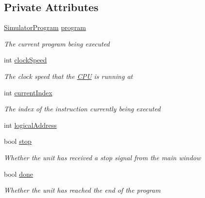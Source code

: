 \subsection*{Private Attributes}
\begin{DoxyCompactItemize}
\item 
\hyperlink{class_c_p_u___o_s___simulator_1_1_c_p_u_1_1_simulator_program}{Simulator\+Program} \hyperlink{class_c_p_u___o_s___simulator_1_1_c_p_u_1_1_execution_unit_a192670bee8ca089c38e9989350f658d6}{program}
\begin{DoxyCompactList}\small\item\em The current program being executed \end{DoxyCompactList}\item 
int \hyperlink{class_c_p_u___o_s___simulator_1_1_c_p_u_1_1_execution_unit_a0deb0a3e0c9fa402598bbf18be6535cc}{clock\+Speed}
\begin{DoxyCompactList}\small\item\em The clock speed that the \hyperlink{namespace_c_p_u___o_s___simulator_1_1_c_p_u}{C\+P\+U} is running at \end{DoxyCompactList}\item 
int \hyperlink{class_c_p_u___o_s___simulator_1_1_c_p_u_1_1_execution_unit_af6807cb5343acc2c40a08166c748f1f0}{current\+Index}
\begin{DoxyCompactList}\small\item\em The index of the instruction currently being executed \end{DoxyCompactList}\item 
int \hyperlink{class_c_p_u___o_s___simulator_1_1_c_p_u_1_1_execution_unit_aa387f2bbbf0de1c75cbd1c79e27a630c}{logical\+Address}
\item 
bool \hyperlink{class_c_p_u___o_s___simulator_1_1_c_p_u_1_1_execution_unit_aad508435c1085ec880b75723260b0439}{stop}
\begin{DoxyCompactList}\small\item\em Whether the unit has received a stop signal from the main window \end{DoxyCompactList}\item 
bool \hyperlink{class_c_p_u___o_s___simulator_1_1_c_p_u_1_1_execution_unit_aa62cb66691fd4d782a4fa5c70843da6e}{done}
\begin{DoxyCompactList}\small\item\em Whether the unit has reached the end of the program \end{DoxyCompactList}\end{DoxyCompactItemize}


